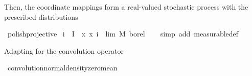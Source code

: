 \begin{isabellebody}
\begin{isamarkuptext}
  Then, the coordinate mappings form a real-valued stochastic process with the prescribed distributions%
\end{isamarkuptext}\isamarkuptrue%
\isamarkupfalse%
\ polish{\isacharunderscore}{\kern0pt}projective\isanewline
{}\isanewline
\isanewline
{}\isamarkupfalse%
\ {\isachardoublequoteopen}i\ {\isasymin}\ I\ {\isasymLongrightarrow}\ {\isacharparenleft}{\kern0pt}{\isasymlambda}x{\isachardot}{\kern0pt}\ x\ i{\isacharparenright}{\kern0pt}\ {\isasymin}\ lim\ {\isasymrightarrow}\isactrlsub M\ borel{\isachardoublequoteclose}\isanewline
%
\isadelimproof
\ \ %
\endisadelimproof
%
\isatagproof
{}\isamarkupfalse%
\ {\isacharparenleft}{\kern0pt}simp\ add{\isacharcolon}{\kern0pt}\ measurable{\isacharunderscore}{\kern0pt}def{\isacharparenright}{\kern0pt}%
\endisatagproof
{\isafoldproof}%
%
\isadelimproof
\isanewline
%
\endisadelimproof
\isanewline
{}\isamarkupfalse%
%
\begin{isamarkuptext}%
Adapting  for the convolution operator%
\end{isamarkuptext}\isamarkuptrue%
\isamarkupfalse%
\ convolution{\isacharunderscore}{\kern0pt}normal{\isacharunderscore}{\kern0pt}density{\isacharunderscore}{\kern0pt}zero{\isacharunderscore}{\kern0pt}mean{\isacharcolon}{\kern0pt}\isanewline

\end{isabellebody}
